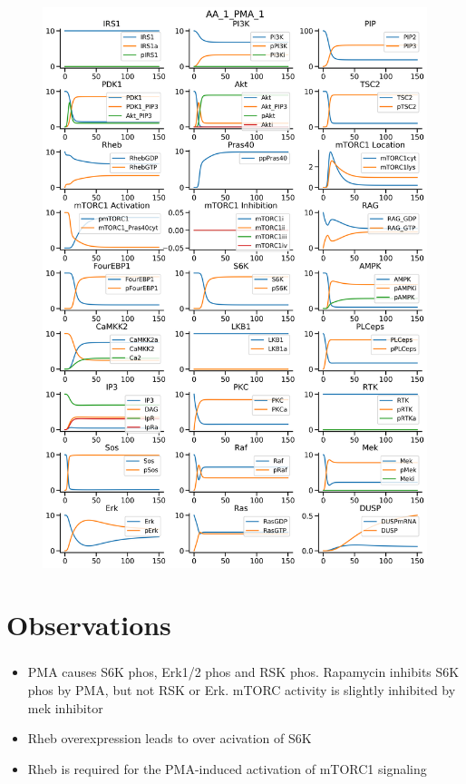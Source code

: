\documentclass{beamer}
\begin{document}
\begin{frame}
\begin{figure}
\begin{minipage}{0.45\textwidth}
        \includegraphics[width=\textwidth]{../simulations/ExtendedPI3KModel/validations/AAWithPMA/AA_1_PMA_1-3.png}
    \end{minipage}
\end{figure}
\end{frame}

\section{Observations}
    \begin{frame}
        \frametitle{ \cite{Miyazaki2017}}
    \begin{itemize}
        \item PMA causes S6K phos, Erk1/2 phos and RSK phos. Rapamycin inhibits S6K phos by PMA, but not RSK or Erk. mTORC activity is slightly inhibited by mek inhibitor
        \item Rheb overexpression leads to over acivation of S6K
        \item Rheb is required for the PMA-induced activation of mTORC1 signaling
    \end{itemize}
    \end{frame}
\end{document}
